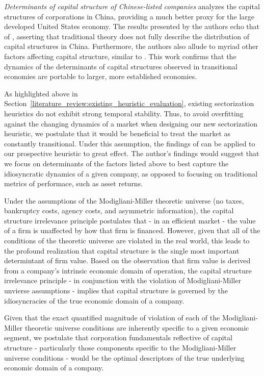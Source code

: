 \documentclass[../main.tex]{subfiles}
\begin{document}
\textit{Determinants of capital structure of Chinese-listed companies} analyzes the capital structures of corporations in China, providing a much better proxy for the large developed United States economy. The results presented by the authors echo that of \citeauthor{Delcoure2007TheEconomies}, asserting that traditional theory does not fully describe the distribution of capital structures in China. Furthermore, the authors also allude to myriad other factors affecting capital structure, similar to \citeauthor{Delcoure2007TheEconomies}. This work confirms that the dynamics of the determinants of capital structures observed in transitional economies are portable to larger, more established economies.

As highlighted above in Section~\ref{literature_review:existing_heuristic_evaluation}, existing sectorization heuristics do not exhibit strong temporal stability. Thus, to avoid overfitting against the changing dynamics of a market when designing our new sectorization heuristic, we postulate that it would be beneficial to treat the market as constantly transitional. Under this assumption, the findings of \citeauthor{Delcoure2007TheEconomies} can be applied to our prospective heuristic to great effect. The author's findings would suggest that we focus on determinants of the factors listed above to best capture the idiosyncratic dynamics of a given company, as opposed to focusing on traditional metrics of performace, such as asset returns.

Under the assumptions of the Modigliani-Miller theoretic universe (no taxes, bankruptcy costs, agency costs, and asymmetric information), the capital structure irrelevance principle postulates that - in an efficient market - the value of a firm is unaffected by how that firm is financed. However, given that all of the conditions of the theoretic universe are violated in the real world, this leads to the profound realization that capital structure is the single most important determintant of firm value. Based on the observation that firm value is derived from a company's intrinsic economic domain of operation, the capital structure irrelevance principle - in conjunction with the violation of Modigliani-Miller unvierse assumptions - implies that capital structure is governed by the idiosyncracies of the true economic domain of a company.

Given that the exact quantified magnitude of violation of each of the Modigliani-Miller theoretic universe conditions are inherently specific to a given economic segment, we postulate that corporation fundamentals reflective of capital structure - particularly those components specific to the Modigliani-Miller universe conditions - would be the optimal descriptors of the true underlying economic domain of a company.
\end{document}
